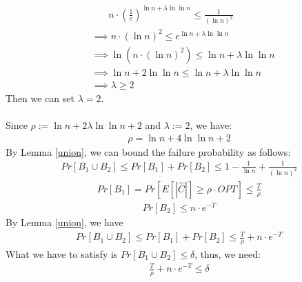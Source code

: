 \begin{align}
  \nonumber &~~~~~~~~n\cdot (\frac{1}{e})^{\ln n + \lambda \ln \ln n} \le \frac{1}{(\ln n)^2}\\
  \nonumber& \implies n\cdot (\ln n)^2 \le e^{\ln n + \lambda \ln \ln n}\\
  \nonumber& \implies \ln(n\cdot (\ln n)^2)\le \ln n + \lambda \ln \ln n\\
  \nonumber& \implies \ln n +2\ln \ln n \le \ln n + \lambda \ln \ln n\\
   \nonumber& \implies \lambda \ge  2
\end{align}
Then we can set $\lambda=2$.\\
\\
Since $\rho:=\ln n+2\lambda \ln\ln n +2$ and $\lambda := 2$, we have:
\begin{align}
  \nonumber \rho = \ln n +4\ln\ln n +2
\end{align}
By Lemma \ref{union}, we can bound the failure probability as follows:
\begin{align}
  \nonumber Pr[B_1 \cup B_2]\le Pr[B_1]+Pr[B_2]\le 1-\frac{1}{\ln n}+\frac{1}{(\ln n)^2}
\end{align}
\begin{align}
  \nonumber Pr[B_1]=Pr[E[|\widehat{C}|]\ge \rho \cdot OPT]\le \frac{T}{\rho}%
\end{align}
\begin{align}
  \nonumber Pr[B_2]\le n\cdot e^{-T}
\end{align}
By  Lemma \ref{union}, we have 
\begin{align}
  \nonumber Pr[B_1 \cup B_2]\le Pr[B_1]+Pr[B_2] \le \frac{T}{\rho}+n\cdot e^{-T}
\end{align}
What we have to satisfy is $Pr[B_1 \cup B_2]\le \delta$, thus, we need:
\begin{align}
  \nonumber \frac{T}{\rho}+n\cdot e^{-T} \le \delta
\end{align}